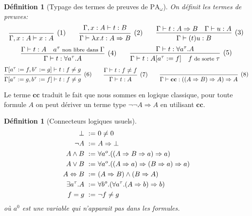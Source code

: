 \documentclass[a4paper,12pt]{article}
\newtheorem{defi}[theo]{Définition}
\theoremstyle{rmqstyle}
\newcommand{\PA}{\mathrm{PA}}
\renewcommand{\implies}{\Rightarrow}
\renewcommand{\iff}{\Leftrightarrow}
\newcommand{\cc}{\mathbf{cc}}
\begin{document}
\begin{defi}[Typage des termes de preuves de $\PA_\omega$]
On définit les termes de preuves:
$$
\begin{prooftree}[center=false]
\infer0[(1)]{\Gamma, x : A \vdash x : A}
\end{prooftree}
\qquad
\begin{prooftree}[center=false]
\hypo{\Gamma, x : A \vdash t : B}
\infer1[(2)]{\Gamma \vdash \lambda x.t : A \implies B}
\end{prooftree}
\qquad
\begin{prooftree}[center=false]
\hypo{\Gamma \vdash t : A \implies B \quad \Gamma \vdash u : A}
\infer1[(3)]{\Gamma \vdash (t)u : B}
\end{prooftree}
$$
$$
\begin{prooftree}[center=false]
\hypo{\Gamma \vdash t : A \quad {\footnotesize a^\tau \text{ non libre dans } \Gamma}}
\infer1[(4)]{\Gamma \vdash t : \forall a^\tau. A}
\end{prooftree}
\qquad
\begin{prooftree}[center=false]
\hypo{\Gamma \vdash t : \forall a^\tau. A}
\infer1[(5)]{\Gamma \vdash t :A[a^\tau := f] \quad {\footnotesize f \text{ de sorte } \tau}}
\end{prooftree}
$$
$$
\begin{prooftree}[center=false]
\hypo{\Gamma[a^\tau := f, b^\tau := g] \vdash t : f \neq g}
\infer1[(6)]{\Gamma[a^\tau := g, b^\tau := f] \vdash t : f \neq g}
\end{prooftree}
\qquad
\begin{prooftree}[center=false]
\hypo{\Gamma \vdash t : f \neq f}
\infer1[(7)]{\Gamma \vdash t : A}
\end{prooftree}
\qquad
\begin{prooftree}[center=false]
\infer0[(8)]{\Gamma \vdash \cc : ((A \implies B) \implies A) \implies A}
\end{prooftree}
$$
\end{defi}

Le terme $\cc$ traduit le fait que nous sommes en logique classique, pour toute formule $A$ on peut dériver un terme type $\neg \neg A \implies A$ en utilisant $\cc$.

\begin{defi}[Connecteurs logiques usuels]
\begin{align*}
\setlength\itemsep{ -1 em}
\bot \ :=& \ 0 \neq 0 \\
\neg A \ :=& \ A \implies \bot \\
A \land B \ :=& \ \forall a^o.((A \implies B \implies a) \implies a)\\
A \lor B \ :=& \ \forall a^o.((A \implies a) \implies (B \implies a) \implies a)\\
A \iff B \ :=& \ (A \implies B) \land (B \implies A)\\
\exists a^\tau. A \ :=& \ \forall b^o.(\forall a^\tau. (A \implies b) \implies b)\\
f = g \ :=& \ \neg f \neq g
\end{align*}
où $a^0$ est une variable qui n'apparait pas dans les formules. 
\end{defi}
\end{document}
